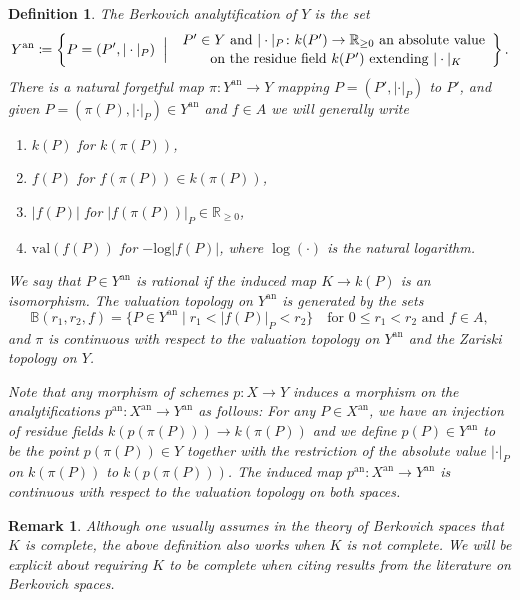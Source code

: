 \documentclass[12pt,reqno,a4paper]{amsart}
\theoremstyle{theoremstyle}
\theoremstyle{examplestyle}
\newtheorem{definition}[theorem]{Definition}
\newtheorem{remark}[theorem]{Remark}
\theoremstyle{algorithmstyle}
\newcommand{\RR}{\mathbb{R}}
\newcommand{\suchthat}{\;\ifnum\currentgrouptype=16 \middle\fi|\;}
\newcommand{\bigmid}{\left.\vphantom{\Big\{} \suchthat \vphantom{\Big\}}\right.}
\newcommand{\an}{{\mathrm{an}}}
\begin{document}
\begin{definition}
  \label{def:analytification}
  The \emph{Berkovich analytification} of $Y$ is the set
  \begin{equation*}
    Y^{\mathrm{an}}\coloneqq \left\{ P = (P',|\cdot |_P) \bigmid
      \begin{array}{c}
        P'\in Y \text{ and } |\cdot|_P\colon k(P')\rightarrow\mathbb{R}_{\geq 0} \text{ an absolute value}\\[0.5mm]
        \text{ on the residue field } k(P') \text{ extending } |\cdot|_K
      \end{array}
    \right\}.
  \end{equation*}
  There is a natural forgetful map $\pi\colon Y^{\mathrm{an}}\to{Y}$ mapping $P=(P',|\cdot|_P)$ to $P'$, and given $P=(\pi(P),|\cdot|_P)\in Y^\an$ and $f\in A$ we will generally write %
  \begin{enumerate}
  \item $k(P)$ for $k(\pi(P))$,
  \item $f(P)$ for $f(\pi(P))\in k(\pi(P))$,
  \item $|f(P)|$ for $|f(\pi(P))|_P\in \RR_{\geq 0}$,
  \item $\mathrm{val}(f(P))$ for $-\mathrm{log}|f(P)|$, where $\log(\cdot)$ is the natural logarithm.  
  \end{enumerate}
  We say that $P\in Y^\an$ is \emph{rational} if the induced map $K\to{k(P)}$ is an isomorphism.\linebreak
  The valuation topology on $Y^{\mathrm{an}}$ is generated by the sets
  \begin{equation*}
    \mathbb{B}(r_{1},r_{2},f)=\{P\in Y^\an\mid r_{1}<|f(P)|_P<r_{2}\} \quad\text{for } 0\leq r_1<r_2 \text{ and } f\in A,
  \end{equation*}
  and $\pi$ is continuous with respect to the valuation topology on $Y^{\an}$ and the Zariski topology on $Y$.

  Note that any morphism of schemes $p\colon X\rightarrow Y$ induces a morphism on the analytifications $p^{\mathrm{an}}\colon X^{\mathrm{an}}\to{Y^{\mathrm{an}}}$ as follows:
  For any $P\in X^{\an}$, we have an injection of residue fields $k(p(\pi(P)))\to k(\pi(P))$ and we define $p(P)\in Y^{\an}$ to be the point $p(\pi(P))\in Y$ together with the restriction of the absolute value $|\cdot|_P$ on $k(\pi(P))$ to $k(p(\pi(P)))$. The induced map $p^{\an}\colon X^{\an}\to Y^{\an}$ is continuous with respect to the valuation topology on both spaces.
\end{definition}
\begin{remark}
    Although one usually assumes in the theory of Berkovich spaces that $K$ is complete, the above definition also works when $K$ is not complete. We will be explicit about requiring $K$ to be complete when citing results from the literature on Berkovich spaces.
\end{remark}
\end{document}
